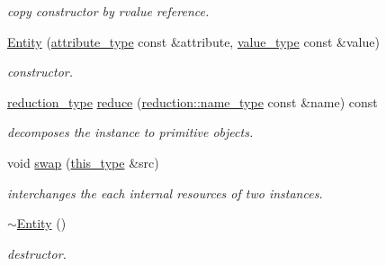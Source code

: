 \begin{DoxyCompactItemize}
\begin{DoxyCompactList}\small\item\em copy constructor by rvalue reference. \end{DoxyCompactList}\item 
\hypertarget{classhryky_1_1http_1_1header_1_1parameter_1_1_entity_a54855ea65c2bc3ac390677febcaef003}{\hyperlink{classhryky_1_1http_1_1header_1_1parameter_1_1_entity_a54855ea65c2bc3ac390677febcaef003}{Entity} (\hyperlink{classhryky_1_1_vector}{attribute\-\_\-type} const \&attribute, \hyperlink{classhryky_1_1_vector}{value\-\_\-type} const \&value)}\label{classhryky_1_1http_1_1header_1_1parameter_1_1_entity_a54855ea65c2bc3ac390677febcaef003}

\begin{DoxyCompactList}\small\item\em constructor. \end{DoxyCompactList}\item 
\hypertarget{classhryky_1_1http_1_1header_1_1parameter_1_1_entity_aaccd50257377c4e30ed98fabf471cfc9}{\hyperlink{namespacehryky_a343a9a4c36a586be5c2693156200eadc}{reduction\-\_\-type} \hyperlink{classhryky_1_1http_1_1header_1_1parameter_1_1_entity_aaccd50257377c4e30ed98fabf471cfc9}{reduce} (\hyperlink{namespacehryky_1_1reduction_ac686c30a4c8d196bbd0f05629a6b921f}{reduction\-::name\-\_\-type} const \&name) const }\label{classhryky_1_1http_1_1header_1_1parameter_1_1_entity_aaccd50257377c4e30ed98fabf471cfc9}

\begin{DoxyCompactList}\small\item\em decomposes the instance to primitive objects. \end{DoxyCompactList}\item 
\hypertarget{classhryky_1_1http_1_1header_1_1parameter_1_1_entity_a3d7a623863d8b69b3c2ffda64716b993}{void \hyperlink{classhryky_1_1http_1_1header_1_1parameter_1_1_entity_a3d7a623863d8b69b3c2ffda64716b993}{swap} (\hyperlink{classhryky_1_1http_1_1header_1_1parameter_1_1_entity_a038d813a72a33f6d764913045d15120e}{this\-\_\-type} \&src)}\label{classhryky_1_1http_1_1header_1_1parameter_1_1_entity_a3d7a623863d8b69b3c2ffda64716b993}

\begin{DoxyCompactList}\small\item\em interchanges the each internal resources of two instances. \end{DoxyCompactList}\item 
\hypertarget{classhryky_1_1http_1_1header_1_1parameter_1_1_entity_a22ff71c2d21ab34f126f0a9cdb44fc97}{\hyperlink{classhryky_1_1http_1_1header_1_1parameter_1_1_entity_a22ff71c2d21ab34f126f0a9cdb44fc97}{$\sim$\-Entity} ()}\label{classhryky_1_1http_1_1header_1_1parameter_1_1_entity_a22ff71c2d21ab34f126f0a9cdb44fc97}

\begin{DoxyCompactList}\small\item\em destructor. \end{DoxyCompactList}\end{DoxyCompactItemize}
